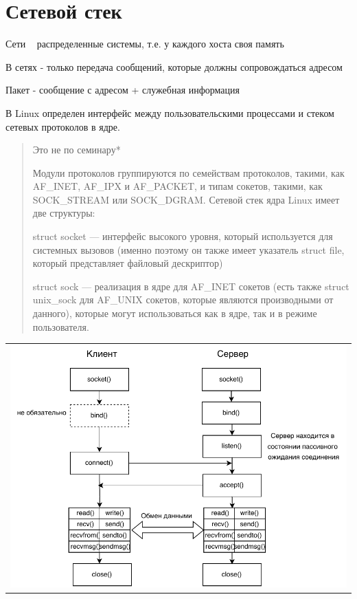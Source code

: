 \section{Сетевой стек}

Сети ~ распределенные системы, т.е. у каждого хоста своя память

В сетях - только передача сообщений, которые должны сопровождаться адресом

Пакет - сообщение с адресом + служебная информация 

В Linux определен интерфейс между пользовательскими процессами и стеком сетевых протоколов в ядре.

\begin{quote}
Это не по семинару*

Модули протоколов группируются по семействам протоколов, такими, как AF\_INET, AF\_IPX и AF\_PACKET, и типам сокетов, такими, как SOCK\_STREAM или SOCK\_DGRAM. Сетевой стек ядра Linux имеет две структуры:

struct socket — интерфейс высокого уровня, который используется для системных вызовов (именно поэтому он также имеет указатель struct file, который представляет файловый дескриптор)

struct sock — реализация в ядре для AF\_INET сокетов (есть также struct unix\_sock для AF\_UNIX сокетов, которые являются производными от данного), которые могут использоваться как в ядре, так и в режиме пользователя.
\end{quote}

\begin{table}[H]
  \centering
  \begin{tabular}{p{1\linewidth}}
    \centering
    \includegraphics[width=0.8\linewidth]{./images/4.pdf}
  \end{tabular}
\end{table}

